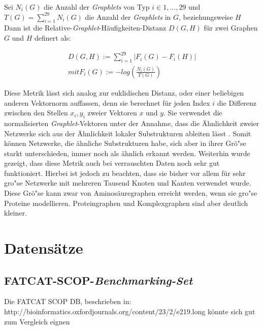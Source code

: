 \documentclass{report}
\begin{document}
Sei $N_{i}(G)$ die Anzahl der \textit{Graphlets} von Typ $i \in {1,...,29}$ und \\ $T(G) = \sum_{i = 1}^{29} N_{i}(G)$ die Anzahl der \textit{Graphlets} in $G$, beziehungsweise $H$\\

Dann ist die Relative-\textit{Graphlet}-H\"aufigkeiten-Distanz $D(G,H)$ f\"ur zwei Graphen $G$ und $H$ definert als:

\begin{subequations}
\begin{align}
D(G,H) := \sum_{i = 1}^{29} | F_{i}(G) - F_{i}(H) | \\
mit F_{i}(G) := - log(\frac{N_{i}(G)}{T(G)})
\end{align}
\end{subequations}



Diese Metrik l\"asst sich analog zur euklidischen Distanz, oder einer beliebigen anderen Vektornorm auffassen, denn sie berechnet f\"ur jeden Index $i$ die Differenz zwischen den Stellen $x_i,y_i$ zweier Vektoren $x$ und $y$. Sie verwendet die normalisierten \textit{Graphlet}-Vektoren unter der Annahme, dass die \"Ahnlichkeit zweier Netzwerke sich aus der \"Ahnlichkeit lokaler Substrukturen ableiten l\"asst \cite{frqdistribution}. Somit k\"onnen Netzwerke, die \"ahnliche Substrukturen habe, sich aber in ihrer Gr\"o"se starkt unterschieden, immer noch als \"ahnlich erkannt werden.
Weiterhin wurde gezeigt, \cite{frqdistribution} dass diese Metrik auch bei verrauschten Daten noch sehr gut funktioniert. Hierbei ist jedoch zu beachten, dass sie bisher vor allem f\"ur sehr gro"se Netzwerke mit mehreren Tausend Knoten und Kanten verwendet wurde. Diese Gr\"o"se kann zwar von Aminos\"auregraphen erreicht werden, wenn sie gro"se Proteine modellieren. Proteingraphen und Komplexgraphen sind aber deutlich kleiner.


\section{Datens\"atze}


\subsection{FATCAT-SCOP-\textit{Benchmarking-Set}}

Die FATCAT SCOP DB, beschrieben in: http://bioinformatics.oxfordjournals.org/content/23/2/e219.long
k\"onnte sich gut zum Vergleich eignen
\end{document}
